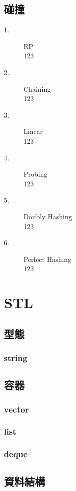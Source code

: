 \documentclass{article}
\begin{document}
\subsection{碰撞}
\begin{description}
\item[ 1.]RP\\
123
\item[ 2.]Chaining\\
123
\item[ 3.]Linear\\
123
\item[ 4.]Probing\\
123
\item[ 5.]Doubly Hashing\\
123
\item[ 6.]Perfect Hashing\\
123
\end{description}


\section{STL}

\subsection{型態}
\subsubsection{string}

\subsection{容器}
\subsubsection{vector}

\subsubsection{list}

\subsubsection{deque}

\subsection{資料結構}
\end{document}

